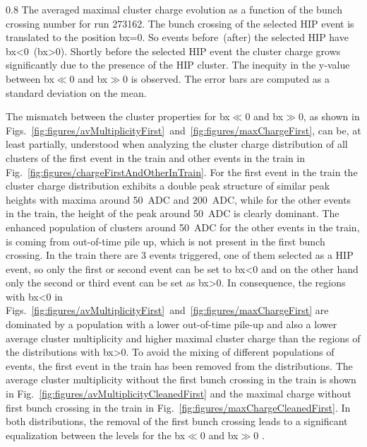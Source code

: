                  {0.8}       %
                 {The averaged maximal cluster charge evolution as a function of the bunch crossing number for run 273162. The bunch crossing of the selected HIP event is translated to the position bx=0. So events before~(after) the selected HIP have bx<0~(bx>0).  Shortly before the selected HIP event the cluster charge grows significantly due to the presence of the HIP cluster. The inequity in the y-value between bx$\ll$0 and bx$\gg$0 is observed. The error bars are computed as a standard deviation on the mean. } %

The mismatch between the cluster properties for bx$\ll$0 and bx$\gg$0, as shown in Figs.~\ref{fig:figures/avMultiplicityFirst}~and~\ref{fig:figures/maxChargeFirst}, can be, at least partially, understood when analyzing the cluster charge distribution of all clusters of the first event in the train and other events in the train in Fig.~\ref{fig:figures/chargeFirstAndOtherInTrain}. For the first event in the train the cluster charge distribution exhibits a double peak structure of similar peak heights with maxima around 50~ADC and 200~ADC, while for the other events in the train, the height of the peak around 50~ADC is clearly dominant. The enhanced population of clusters around 50~ADC for the other events in the train, is coming from out-of-time pile up, which is not present in the first bunch crossing. In the train there are 3 events triggered, one of them selected as a HIP event, so only the first or second event can be set to bx<0 and on the other hand only the second or third event can be set as bx>0. In consequence, the regions with bx<0 in Figs.~\ref{fig:figures/avMultiplicityFirst}~and~\ref{fig:figures/maxChargeFirst} are dominated by a population with a lower out-of-time pile-up and also a lower average cluster multiplicity and higher maximal cluster charge than the regions of the distributions with bx>0. To avoid the mixing of different populations of events, the first event in the train has been removed from the distributions. The average cluster multiplicity without the first bunch crossing in the train is shown in Fig.~\ref{fig:figures/avMultiplicityCleanedFirst} and the maximal charge without first bunch crossing in the train in Fig.~\ref{fig:figures/maxChargeCleanedFirst}. In both distributions, the removal of the first bunch crossing leads to a significant equalization between the levels for the bx$\ll$0 and bx$\gg$0 .

